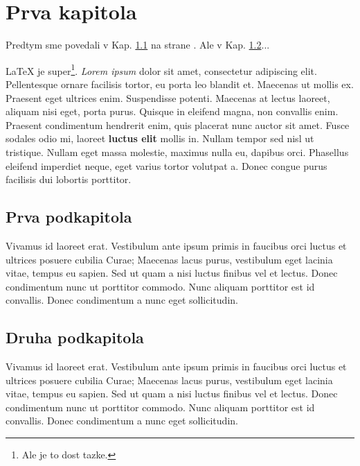
\chapter{Prva kapitola}

Predtym sme povedali v Kap. \ref{s:prva} na strane \pageref{s:prva}. Ale v Kap. \ref{s:druha}...

LaTeX je super\footnote{Ale je to dost tazke.}. \emph{Lorem ipsum} dolor sit amet, consectetur adipiscing elit. Pellentesque ornare facilisis tortor, eu porta leo blandit et. Maecenas ut mollis ex. Praesent eget ultrices enim. Suspendisse potenti. Maecenas at lectus laoreet, aliquam nisi eget, porta purus. Quisque in eleifend magna, non convallis enim. Praesent condimentum hendrerit enim, quis placerat nunc auctor sit amet. Fusce sodales odio mi, laoreet {\bf luctus elit} mollis in. Nullam tempor sed nisl ut tristique. Nullam eget massa molestie, maximus nulla eu, dapibus orci. Phasellus eleifend imperdiet neque, eget varius tortor volutpat a. Donec congue purus facilisis dui lobortis porttitor.

\section{Prva podkapitola}
\label{s:prva}

Vivamus id laoreet erat. Vestibulum ante ipsum primis in faucibus orci luctus et ultrices posuere cubilia Curae; Maecenas lacus purus, vestibulum eget lacinia vitae, tempus eu sapien. Sed ut quam a nisi luctus finibus vel et lectus. Donec condimentum nunc ut porttitor commodo. Nunc aliquam porttitor est id convallis. Donec condimentum a nunc eget sollicitudin.

\section{Druha podkapitola}
\label{s:druha}

Vivamus id laoreet erat. Vestibulum ante ipsum primis in faucibus orci luctus et ultrices posuere cubilia Curae; Maecenas lacus purus, vestibulum eget lacinia vitae, tempus eu sapien. Sed ut quam a nisi luctus finibus vel et lectus. Donec condimentum nunc ut porttitor commodo. Nunc aliquam porttitor est id convallis. Donec condimentum a nunc eget sollicitudin.
